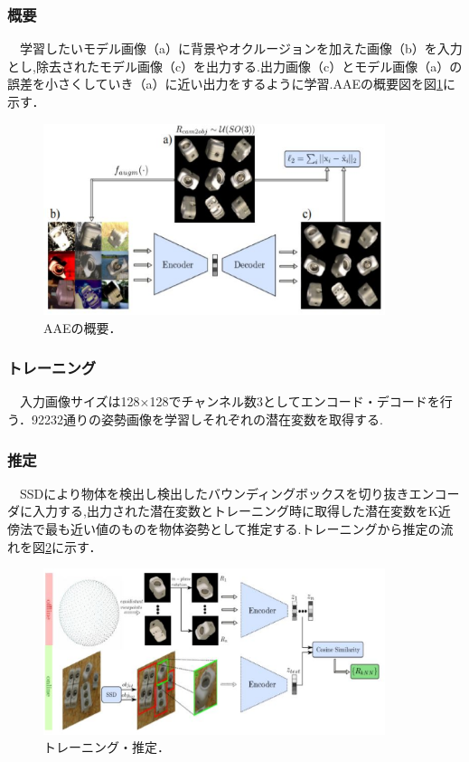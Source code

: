 \documentclass[11pt,a4j,ascmac]{jsarticle}
\begin{document}
\subsubsection{概要}
　学習したいモデル画像（a）に背景やオクルージョンを加えた画像（b）を入力とし,除去されたモデル画像（c）を出力する.出力画像（c）とモデル画像（a）の誤差を小さくしていき（a）に近い出力をするように学習.AAEの概要図を図\ref{style1}に示す．
　


      \begin{figure}[htpp]
      \centering
      \includegraphics[width=100mm]{11-1.eps}
      \vspace*{25mm}
      \caption{AAEの概要．}
      \label{style1}
      \end{figure}

\subsubsection{トレーニング}
　入力画像サイズは128×128でチャンネル数3としてエンコード・デコードを行う．92232通りの姿勢画像を学習しそれぞれの潜在変数を取得する.

\subsubsection{推定}
　SSDにより物体を検出し検出したバウンディングボックスを切り抜きエンコーダに入力する,出力された潜在変数とトレーニング時に取得した潜在変数をK近傍法で最も近い値のものを物体姿勢として推定する.トレーニングから推定の流れを図\ref{style2}に示す．
　


      \begin{figure}[htpp]
      \centering
      \includegraphics[width=100mm]{11-2.eps}
      \vspace*{25mm}
      \caption{トレーニング・推定．}
      \label{style2}
      \end{figure}
\end{document}
